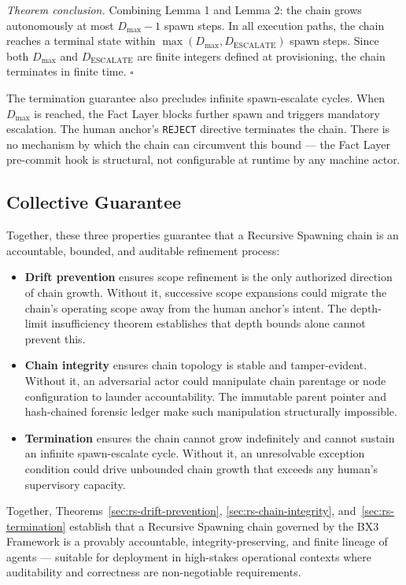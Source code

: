 \medskip
\textit{Theorem conclusion.} Combining Lemma 1 and Lemma 2: the chain grows autonomously at most $D_{\mathrm{max}} - 1$ spawn steps. In all execution paths, the chain reaches a terminal state within $\max(D_{\mathrm{max}}, D_{\mathrm{ESCALATE}})$ spawn steps. Since both $D_{\mathrm{max}}$ and $D_{\mathrm{ESCALATE}}$ are finite integers defined at provisioning, the chain terminates in finite time. $\square$

The termination guarantee also precludes infinite spawn-escalate cycles. When $D_{\mathrm{max}}$ is reached, the Fact Layer blocks further spawn and triggers mandatory escalation. The human anchor's \texttt{REJECT} directive terminates the chain. There is no mechanism by which the chain can circumvent this bound — the Fact Layer pre-commit hook is structural, not configurable at runtime by any machine actor.

\subsection{Collective Guarantee}
\label{sec:rs-collective-guarantee}

Together, these three properties guarantee that a Recursive Spawning chain is an accountable, bounded, and auditable refinement process:

\begin{itemize}
  \item \textbf{Drift prevention} ensures scope refinement is the only authorized direction of chain growth. Without it, successive scope expansions could migrate the chain's operating scope away from the human anchor's intent. The depth-limit insufficiency theorem establishes that depth bounds alone cannot prevent this.
  \item \textbf{Chain integrity} ensures chain topology is stable and tamper-evident. Without it, an adversarial actor could manipulate chain parentage or node configuration to launder accountability. The immutable parent pointer and hash-chained forensic ledger make such manipulation structurally impossible.
  \item \textbf{Termination} ensures the chain cannot grow indefinitely and cannot sustain an infinite spawn-escalate cycle. Without it, an unresolvable exception condition could drive unbounded chain growth that exceeds any human's supervisory capacity.
\end{itemize}

Together, Theorems~\ref{sec:rs-drift-prevention}, \ref{sec:rs-chain-integrity}, and~\ref{sec:rs-termination} establish that a Recursive Spawning chain governed by the BX3 Framework is a provably accountable, integrity-preserving, and finite lineage of agents — suitable for deployment in high-stakes operational contexts where auditability and correctness are non-negotiable requirements.